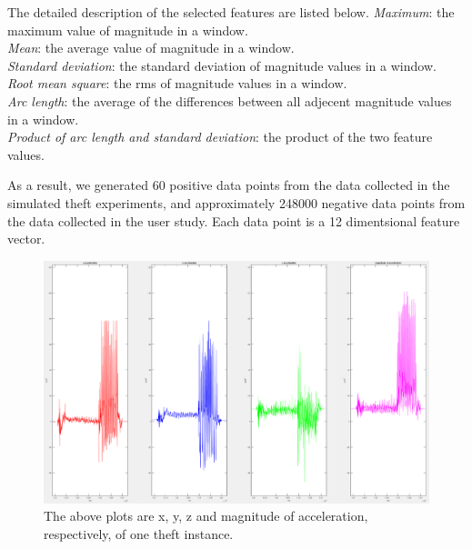 \documentclass{soups}
\begin{document}
The detailed description of the selected features are listed below.
\textit{Maximum}: the maximum value of magnitude in a window. \\
\textit{Mean}: the average value of magnitude in a window. \\
\textit{Standard deviation}: the standard deviation of magnitude values in a window. \\
\textit{Root mean square}: the rms of magnitude values in a window. \\
\textit{Arc length}: the average of the differences between all adjecent magnitude values in a window. \\
\textit{Product of arc length and standard deviation}: the product of the two feature values.

As a result, we generated 60 positive data points from the data collected in the simulated theft experiments, and approximately 248000 negative data points from the data collected in the user study. 
Each data point is a 12 dimentsional feature vector.



\begin{figure}[H]
\includegraphics[width=1.0\columnwidth]{pos_acc_separated.png}
\caption{The above plots are x, y, z and magnitude of acceleration, respectively, of one theft instance.}
\end{figure}
\end{document}

